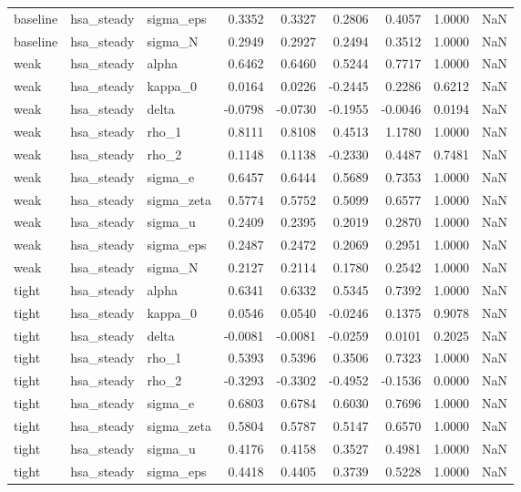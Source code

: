 \begin{tabular}{lllrrrrrl}
baseline & hsa\_steady & sigma\_eps & 0.3352 & 0.3327 & 0.2806 & 0.4057 & 1.0000 & NaN \\
baseline & hsa\_steady & sigma\_N & 0.2949 & 0.2927 & 0.2494 & 0.3512 & 1.0000 & NaN \\
weak & hsa\_steady & alpha & 0.6462 & 0.6460 & 0.5244 & 0.7717 & 1.0000 & NaN \\
weak & hsa\_steady & kappa\_0 & 0.0164 & 0.0226 & -0.2445 & 0.2286 & 0.6212 & NaN \\
weak & hsa\_steady & delta & -0.0798 & -0.0730 & -0.1955 & -0.0046 & 0.0194 & NaN \\
weak & hsa\_steady & rho\_1 & 0.8111 & 0.8108 & 0.4513 & 1.1780 & 1.0000 & NaN \\
weak & hsa\_steady & rho\_2 & 0.1148 & 0.1138 & -0.2330 & 0.4487 & 0.7481 & NaN \\
weak & hsa\_steady & sigma\_e & 0.6457 & 0.6444 & 0.5689 & 0.7353 & 1.0000 & NaN \\
weak & hsa\_steady & sigma\_zeta & 0.5774 & 0.5752 & 0.5099 & 0.6577 & 1.0000 & NaN \\
weak & hsa\_steady & sigma\_u & 0.2409 & 0.2395 & 0.2019 & 0.2870 & 1.0000 & NaN \\
weak & hsa\_steady & sigma\_eps & 0.2487 & 0.2472 & 0.2069 & 0.2951 & 1.0000 & NaN \\
weak & hsa\_steady & sigma\_N & 0.2127 & 0.2114 & 0.1780 & 0.2542 & 1.0000 & NaN \\
tight & hsa\_steady & alpha & 0.6341 & 0.6332 & 0.5345 & 0.7392 & 1.0000 & NaN \\
tight & hsa\_steady & kappa\_0 & 0.0546 & 0.0540 & -0.0246 & 0.1375 & 0.9078 & NaN \\
tight & hsa\_steady & delta & -0.0081 & -0.0081 & -0.0259 & 0.0101 & 0.2025 & NaN \\
tight & hsa\_steady & rho\_1 & 0.5393 & 0.5396 & 0.3506 & 0.7323 & 1.0000 & NaN \\
tight & hsa\_steady & rho\_2 & -0.3293 & -0.3302 & -0.4952 & -0.1536 & 0.0000 & NaN \\
tight & hsa\_steady & sigma\_e & 0.6803 & 0.6784 & 0.6030 & 0.7696 & 1.0000 & NaN \\
tight & hsa\_steady & sigma\_zeta & 0.5804 & 0.5787 & 0.5147 & 0.6570 & 1.0000 & NaN \\
tight & hsa\_steady & sigma\_u & 0.4176 & 0.4158 & 0.3527 & 0.4981 & 1.0000 & NaN \\
tight & hsa\_steady & sigma\_eps & 0.4418 & 0.4405 & 0.3739 & 0.5228 & 1.0000 & NaN \\

\end{tabular}
